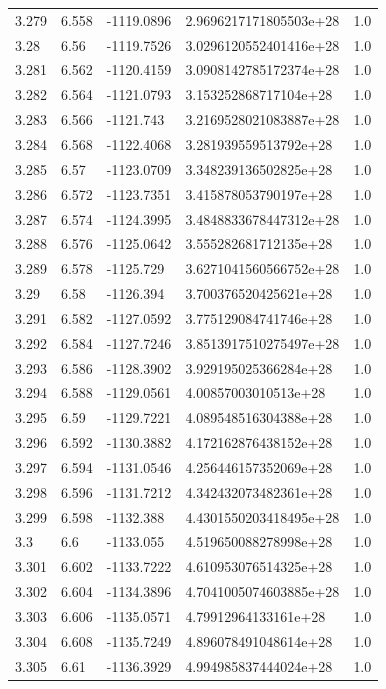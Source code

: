 \begin{tabular}{lllll}
3.279 & 6.558 & -1119.0896 & 2.9696217171805503e+28 & 1.0 \\
3.28 & 6.56 & -1119.7526 & 3.0296120552401416e+28 & 1.0 \\
3.281 & 6.562 & -1120.4159 & 3.0908142785172374e+28 & 1.0 \\
3.282 & 6.564 & -1121.0793 & 3.153252868717104e+28 & 1.0 \\
3.283 & 6.566 & -1121.743 & 3.2169528021083887e+28 & 1.0 \\
3.284 & 6.568 & -1122.4068 & 3.281939559513792e+28 & 1.0 \\
3.285 & 6.57 & -1123.0709 & 3.348239136502825e+28 & 1.0 \\
3.286 & 6.572 & -1123.7351 & 3.415878053790197e+28 & 1.0 \\
3.287 & 6.574 & -1124.3995 & 3.4848833678447312e+28 & 1.0 \\
3.288 & 6.576 & -1125.0642 & 3.555282681712135e+28 & 1.0 \\
3.289 & 6.578 & -1125.729 & 3.6271041560566752e+28 & 1.0 \\
3.29 & 6.58 & -1126.394 & 3.700376520425621e+28 & 1.0 \\
3.291 & 6.582 & -1127.0592 & 3.775129084741746e+28 & 1.0 \\
3.292 & 6.584 & -1127.7246 & 3.8513917510275497e+28 & 1.0 \\
3.293 & 6.586 & -1128.3902 & 3.929195025366284e+28 & 1.0 \\
3.294 & 6.588 & -1129.0561 & 4.00857003010513e+28 & 1.0 \\
3.295 & 6.59 & -1129.7221 & 4.089548516304388e+28 & 1.0 \\
3.296 & 6.592 & -1130.3882 & 4.172162876438152e+28 & 1.0 \\
3.297 & 6.594 & -1131.0546 & 4.256446157352069e+28 & 1.0 \\
3.298 & 6.596 & -1131.7212 & 4.342432073482361e+28 & 1.0 \\
3.299 & 6.598 & -1132.388 & 4.4301550203418495e+28 & 1.0 \\
3.3 & 6.6 & -1133.055 & 4.519650088278998e+28 & 1.0 \\
3.301 & 6.602 & -1133.7222 & 4.610953076514325e+28 & 1.0 \\
3.302 & 6.604 & -1134.3896 & 4.7041005074603885e+28 & 1.0 \\
3.303 & 6.606 & -1135.0571 & 4.79912964133161e+28 & 1.0 \\
3.304 & 6.608 & -1135.7249 & 4.896078491048614e+28 & 1.0 \\
3.305 & 6.61 & -1136.3929 & 4.994985837444024e+28 & 1.0 \\

\end{tabular}

